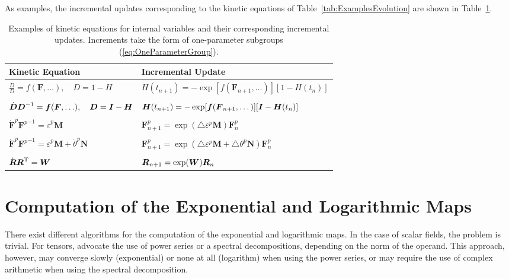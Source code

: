 \documentclass[12pt]{article}
\newcommand{\mbs}[1]{\boldsymbol{#1}}
\def\bD{{\mbs{D}}} \def\bE{{\mbs{E}}} \def\bF{{\mbs{F}}}
\def\bM{{\mbs{M}}} \def\bN{{\mbs{N}}} \def\bO{{\mbs{O}}}
\begin{document}
As examples, the incremental updates corresponding to the kinetic
equations of Table~\ref{tab:ExamplesEvolution} are shown in
Table~\ref{tab:ExamplesIncrements}.

\begin{table}[htbp]
  \begin{center}
    \begin{tabular}{ l l }
      \toprule
      Kinetic Equation
      &
      Incremental Update
      \\
      \hline
      $\displaystyle\frac{\dot{D}}{D} =
        f(\bF,\ldots),\quad D = 1 - H$
      &
      $H(t_{n+1}) = - \exp[f(\bF_{n+1}, \dots)] [1 - H(t_{n})]$
      \\
      \\
      $\dot{\bD}\bD^{-1} =
      \fb(\bF,\ldots), \quad \bD = \bI - \bH$
      &
      $\bH(t_{n+1}) = - \exp[\fb(\bF_{n+1}, \dots)] [\bI - \bH(t_{n})]$
      \\
      \\
      $\dot{\bF}^p {\bF^p}^{-1} = \dot{\varepsilon}^p \bM$
      &
      $\bF^p_{n+1} = \exp(\triangle \varepsilon^p \bM) \bF^p_{n}$
      \\
      \\
      $\dot{\bF}^p {\bF^p}^{-1} = \dot{\varepsilon}^p \bM +
      \dot{\theta}^p \bN$
      &
      $\bF^p_{n+1} =
      \exp(\triangle \varepsilon^p \bM + \triangle
      \theta^p \bN) \bF^p_{n}$
      \\
      \\
      $\dot{\bR} {\bR}^{\text{T}} = \bW$
      &
      $\bR_{n+1} = \exp(\bW) \bR_{n}$
      \\
      \bottomrule
    \end{tabular}
    \caption{Examples of kinetic equations for internal variables and
      their corresponding incremental updates. Increments take the
      form of one-parameter subgroups (\ref{eq:OneParameterGroup}).}
    \label{tab:ExamplesIncrements}
  \end{center}
\end{table}

\section{Computation of the Exponential and Logarithmic Maps}
\label{sec:explogmaps}

There exist different algorithms for the computation of the
exponential and logarithmic maps. In the case of scalar fields, the
problem is trivial. For tensors, \citet*{Ortiz.etal:2001} advocate the
use of power series or a spectral decompositions, depending on the
norm of the operand. This approach, however, may converge slowly
(exponential) or none at all (logarithm) when using the power series,
or may require the use of complex arithmetic when using the spectral
decomposition.
\end{document}
